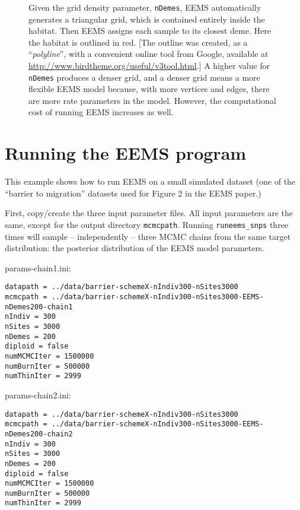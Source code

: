 \documentclass[a4paper,10pt,DIV=15,titlepage,mpinclude=true]{scrartcl}
\newcommand{\keystring}[1]{{\tt #1}}
\begin{document}
{\begin{figure}[!]
\caption[The triangular grid -- an example]{Given the grid density parameter, \keystring{nDemes}, EEMS automatically generates a triangular grid, which is contained entirely inside the habitat. Then EEMS assigns each sample to its closest deme. Here the habitat is outlined in red. [The outline was created, as a ``\textit{polyline}'', with a convenient online tool from Google, available at \url{http://www.birdtheme.org/useful/v3tool.html}.] A higher value for \keystring{nDemes} produces a denser grid, and a denser grid means a more flexible EEMS model because, with more vertices and edges, there are more rate parameters in the model. However, the computational cost of running EEMS increases as well.}
\label{fig:wang_etal2012-nIndiv314-irregular-habitat:nDemes-choice}
\end{figure}
\clearpage}

\newpage 

\section{Running the EEMS program}\label{sec:running-eems}

This example shows how to run EEMS on a small simulated dataset (one of the ``barrier to migration'' datasets used for Figure 2 in the EEMS paper.)

First, copy/create the three input parameter files. All input parameters are the same, except for the output directory \keystring{mcmcpath}. Running \keystring{runeems\_snps} three times will sample -- independently -- three MCMC chains from the same target distribution: the posterior distribution of the EEMS model parameters.

\bigskip

\noindent params-chain1.ini:
\begin{lstlisting}[style=Cppcode]
datapath = ../data/barrier-schemeX-nIndiv300-nSites3000
mcmcpath = ../data/barrier-schemeX-nIndiv300-nSites3000-EEMS-nDemes200-chain1
nIndiv = 300
nSites = 3000
nDemes = 200
diploid = false
numMCMCIter = 1500000
numBurnIter = 500000
numThinIter = 2999
\end{lstlisting}

\noindent params-chain2.ini:
\begin{lstlisting}[style=Cppcode]
datapath = ../data/barrier-schemeX-nIndiv300-nSites3000
mcmcpath = ../data/barrier-schemeX-nIndiv300-nSites3000-EEMS-nDemes200-chain2
nIndiv = 300
nSites = 3000
nDemes = 200
diploid = false
numMCMCIter = 1500000
numBurnIter = 500000
numThinIter = 2999
\end{lstlisting}
\end{document}
